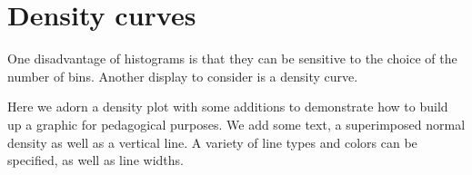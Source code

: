 \section{Density curves}

 One disadvantage of histograms is that they can be sensitive to the choice of the number of bins.  Another display to consider is a density curve.

Here we adorn a density plot with some additions to demonstrate how to build up a graphic for pedagogical purposes. We add some text, a superimposed normal density as well as a vertical line. A variety of line types and colors can be specified, as well as line widths.


